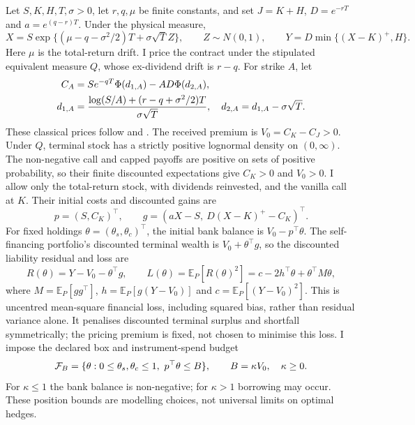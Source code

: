 \documentclass[11pt]{article}
\begin{document}
Let $S,K,H,T,\sigma>0$, let $r,q,\mu$ be finite constants, and set
$J=K+H$, $D=e^{-rT}$ and $a=e^{(q-r)T}$. Under the physical measure,
\begin{equation}
 X=S\exp\{(\mu-q-\sigma^2/2)T+\sigma\sqrt T Z\},\qquad
 Z\sim N(0,1),\qquad Y=D\min\{(X-K)^+,H\}.
 \label{eq:h-physical-law}
\end{equation}
Here $\mu$ is the total-return drift. I price the contract under the
stipulated equivalent measure $Q$, whose ex-dividend drift is $r-q$.
For strike $A$, let
\begin{align}
 C_A&=S e^{-qT}\Phi(d_{1,A})-A D\Phi(d_{2,A}),\notag\\
 d_{1,A}&=\frac{\log(S/A)+(r-q+\sigma^2/2)T}{\sigma\sqrt T},
 \quad d_{2,A}=d_{1,A}-\sigma\sqrt T.
 \label{eq:h-fair-premiums}
\end{align}
These classical prices follow \citet{blackscholes1973} and
\citet{merton1973}. The received premium is $V_0=C_K-C_J>0$. Under $Q$, terminal stock has a strictly positive
lognormal density on $(0,\infty)$. The non-negative call and capped
payoffs are positive on sets of positive probability, so their finite
discounted expectations give $C_K>0$ and $V_0>0$. I allow only the
total-return stock, with dividends reinvested, and the vanilla call
at $K$. Their initial costs and discounted gains are
\begin{equation}
 p=(S,C_K)^\top,\qquad
 g=(aX-S,\ D(X-K)^+-C_K)^\top.
 \label{eq:h-instruments}
\end{equation}
For fixed holdings $\theta=(\theta_s,\theta_c)^\top$, the initial bank
balance is $V_0-p^\top\theta$. The self-financing portfolio's discounted
terminal wealth is $V_0+\theta^\top g$, so the discounted liability
residual and loss are
\begin{equation}
 R(\theta)=Y-V_0-\theta^\top g,\qquad
 L(\theta)=\mathbb E_P[R(\theta)^2]
 =c-2h^\top\theta+\theta^\top M\theta,
 \label{eq:h-risk}
\end{equation}
where $M=\mathbb E_P[gg^\top]$, $h=\mathbb E_P[g(Y-V_0)]$ and
$c=\mathbb E_P[(Y-V_0)^2]$. This is uncentred mean-square financial
loss, including squared bias, rather than residual variance alone.
It penalises discounted terminal surplus and shortfall symmetrically;
the pricing premium is fixed, not chosen to minimise this loss.
I impose the declared box and instrument-spend budget
\begin{equation}
 {\cal F}_B=\{\theta:0\leq\theta_s,\theta_c\leq1,\
 p^\top\theta\leq B\},\qquad B=\kappa V_0,\quad \kappa\geq0.
 \label{eq:h-feasible-set}
\end{equation}
For $\kappa\leq1$ the bank balance is non-negative; for $\kappa>1$
borrowing may occur. These position bounds are modelling choices,
not universal limits on optimal hedges.
\end{document}
